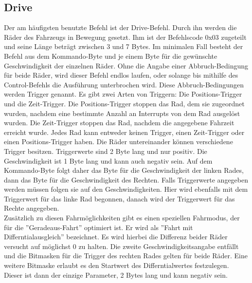 \subsection{Drive}
Der am häufigsten benutzte Befehl ist der Drive-Befehl. Durch ihn werden die Räder des Fahrzeugs
in Bewegung gesetzt. Ihm ist der Befehlscode 0x03 zugeteilt und seine Länge beträgt zwischen 3
und 7 Bytes. Im minimalen Fall besteht der Befehl aus dem Kommando-Byte und je einem Byte für
die gewünschte Geschwindigkeit der einzelnen Räder. Ohne die Angabe einer Abbruch-Bedingung für
beide Räder, wird dieser Befehl endlos laufen, oder solange bis mithilfe des Control-Befehls
die Ausführung unterbrochen wird. Diese Abbruch-Bedingungen werden Trigger genannt. Es gibt
zwei Arten von Triggern: Die Positions-Trigger und die Zeit-Trigger. Die Positions-Trigger stoppen
das Rad, dem sie zugeordnet wurden, nachdem eine bestimmte Anzahl an Interrupts von dem Rad
ausgelöst wurden. Die Zeit-Trigger stoppen das Rad, nachdem die angegebene Fahrzeit erreicht
wurde. Jedes Rad kann entweder keinen Trigger, einen Zeit-Trigger oder einen Positions-Trigger
haben. Die Räder untereinander können verschiedene Trigger besitzen. Triggerwerte sind
2 Byte lang und nur positiv. Die Geschwindigkeit ist 1 Byte lang und kann auch negativ sein.
Auf dem Kommando-Byte folgt daher das Byte für die Geschwindigkeit der linken Rades, dann
das Byte für die Geschwindigkeit des Rechten. Falls Triggerwerte angegeben werden müssen
folgen sie auf den Geschwindigkeiten. Hier wird ebenfalls mit dem Triggerwert für das
linke Rad begonnen, danach wird der Triggerwert für das Rechte angegeben.\\
Zusätzlich zu diesen Fahrmöglichkeiten gibt es einen speziellen Fahrmodus, der für
die ''Geradeaus-Fahrt'' optimiert ist. Er wird als ''Fahrt mit Differntialausgleich''
bezeichnet. Es wird hierbei die Differenz beider Räder versucht auf möglichst 0 zu
halten. Die zweite Geschwindigkeitsangabe entfällt und die Bitmasken für die Trigger
des rechten Rades gelten für beide Räder. Eine weitere Bitmaske erlaubt es den
Startwert des Differntialwertes festzulegen. Dieser ist dann der einzige Parameter,
2 Bytes lang und kann negativ sein.
